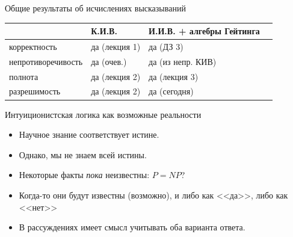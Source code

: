 \documentclass[aspectratio=169]{beamer}
\begin{document}
\begin{frame}{Общие результаты об исчислениях высказываний}
\begin{tabular}{llll}
      & К.И.В. & И.И.В. + алгебры Гейтинга\\\hline
корректность & да (лекция 1) & да (ДЗ 3) \\
непротиворечивость & да (очев.) & да (из непр. КИВ) \\
полнота & да (лекция 2) & да (лекция 3)  \\
разрешимость & да (лекция 2) & да (сегодня)
\end{tabular}
\end{frame}

\begin{frame}{Интуиционистская логика как возможные реальности}
\begin{itemize}
\item Научное знание соответствует истине.
\item Однако, мы не знаем всей истины.
\item Некоторые факты \emph{пока} неизвестны: $P=NP$?
\item Когда-то они будут известны (возможно), и либо как <<да>>, либо как <<нет>>
\item В рассуждениях имеет смысл учитывать оба варианта ответа.
\end{itemize}

\begin{center}\end{center}
\end{frame}
\end{document}
